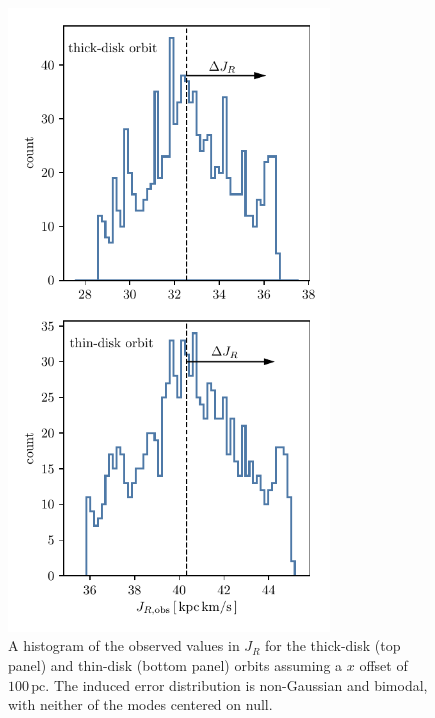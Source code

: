 \documentclass[twocolumn]{aastex62}
\newcommand{\pc}{\text{pc}}
\begin{document}
\begin{figure}
\begin{center}
\includegraphics[width=3.35224200913in]{fig/schmactions_JR_xerr_hist.pdf}
\end{center}
\caption{A histogram of the observed values in $J_R$ for the thick-disk (top
panel) and thin-disk (bottom panel) orbits assuming a $x$ offset of
$100\,\pc$. The induced error distribution is non-Gaussian and bimodal, with
neither of the modes centered on null.}
\label{fig:JR_xerr_hist}
\end{figure}
\end{document}
